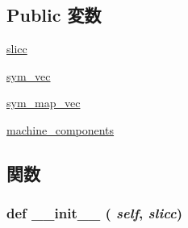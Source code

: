 \subsection*{Public 変数}
\begin{DoxyCompactItemize}
\item 
\hyperlink{classslicc_1_1symbols_1_1SymbolTable_1_1SymbolTable_af640ba17d962addde6088eeefb07aad9}{slicc}
\item 
\hyperlink{classslicc_1_1symbols_1_1SymbolTable_1_1SymbolTable_a8ed11d1bff592e97defa15605581da74}{sym\_\-vec}
\item 
\hyperlink{classslicc_1_1symbols_1_1SymbolTable_1_1SymbolTable_ae6e20f52b0d5fc317e81f6928035d7c7}{sym\_\-map\_\-vec}
\item 
\hyperlink{classslicc_1_1symbols_1_1SymbolTable_1_1SymbolTable_aac6330bd7442355af164cd00ceb9de5b}{machine\_\-components}
\end{DoxyCompactItemize}


\subsection{関数}
\hypertarget{classslicc_1_1symbols_1_1SymbolTable_1_1SymbolTable_ac775ee34451fdfa742b318538164070e}{
\subsubsection[{\_\-\_\-init\_\-\_\-}]{\setlength{\rightskip}{0pt plus 5cm}def \_\-\_\-init\_\-\_\- ( {\em self}, \/   {\em slicc})}}
\label{classslicc_1_1symbols_1_1SymbolTable_1_1SymbolTable_ac775ee34451fdfa742b318538164070e}




